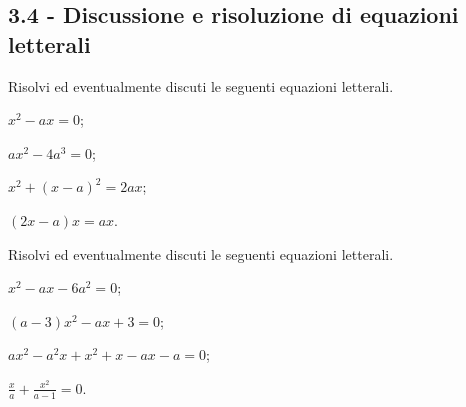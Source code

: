 \subsection*{3.4 - Discussione e risoluzione di equazioni letterali}

\begin{esercizio}[\Ast]
 \label{ese:3.54}
Risolvi ed eventualmente discuti le seguenti equazioni letterali.
\begin{multicols}{2}
\begin{enumeratea}
\item $x^{2}-a x = 0$;
\item $ax^{2}-4a^{3} = 0$;
\item $x^{2} + (x-a)^{2} = 2 a x$;
\item $(2 x-a) x = a x$.
\end{enumeratea}
\end{multicols}
\end{esercizio}

\begin{esercizio}[\Ast]
 \label{ese:3.55}
Risolvi ed eventualmente discuti le seguenti equazioni letterali.
\begin{multicols}{2}
\begin{enumeratea}
\item $x^{2}-a x-6 a^{2} = 0$;
\item $(a-3) x^{2}-a x + 3 = 0$;
\item $a x^{2}-a^{2} x + x^{2} + x-a x-a = 0$;
\item $\frac{x}{a} + \frac{x^{2}}{a-1} = 0$.
\end{enumeratea}
\end{multicols}
\end{esercizio}

